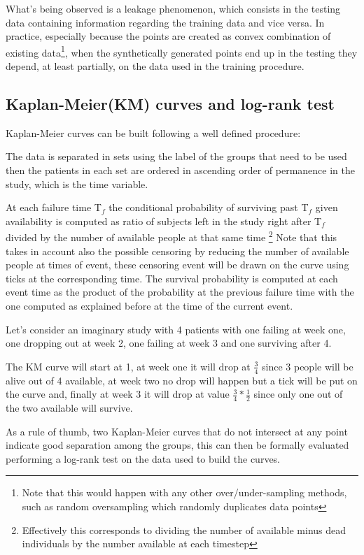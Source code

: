 What's being observed is a leakage phenomenon, which consists in the testing data containing information regarding the training data and vice versa. In practice, especially because the points are created as convex combination of existing data\footnote{Note that this would happen with any other over/under-sampling methods, such as random oversampling which randomly duplicates data points}, when the synthetically generated points end up in the testing they depend, at least partially, on the data used in the training procedure.


\subsection{Kaplan-Meier(KM) curves and log-rank test}
Kaplan-Meier curves can be built following a well defined procedure: 

The data is separated in sets using the label of the groups that need to be used then the patients in each set are ordered in ascending order of permanence in the study, which is the time variable.

At each failure time T$_f$ the conditional probability of surviving past T$_f$ given availability is computed as ratio of subjects left in the study right after T$_f$ divided by the number of available people at that same time
\footnote{Effectively this corresponds to dividing the number of available minus dead individuals by the number available at each timestep}
Note that this takes in account also the possible censoring by reducing the number of available people at times of event, these censoring event will be drawn on the curve using ticks at the corresponding time.
The survival probability is computed at each event time as the product of the probability at the previous failure time with the one computed as explained before at the time of the current event.

Let's consider an imaginary study with 4 patients with one failing at week one, one dropping out at week 2, one failing at week 3 and one surviving after 4.

The KM curve will start at 1, at week one it will drop at $\frac{3}{4}$ since 3 people will be alive out of 4 available, at week two no drop will happen but a tick will be put on the curve and, finally at week 3 it will drop at value $\frac{3}{4}*\frac{1}{2}$ since only one out of the two available will survive.

As a rule of thumb, two Kaplan-Meier curves that do not intersect at any point indicate good separation among the groups, this can then be formally evaluated performing a log-rank test on the data used to build the curves.

